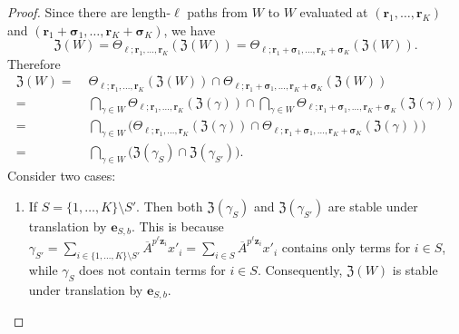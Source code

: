 \documentclass[letterpaper, 11pt, thm-restate]{article}
\numberwithin{equation}{section}
\newcommand{\mZ}{\mathfrak{Z}}
\newcommand{\br}{\boldsymbol{r}}
\newcommand{\bz}{\boldsymbol{z}}
\newcommand{\bsig}{\boldsymbol{\sigma}}
\newcommand{\oA}{\overline{A}}
\theoremstyle{definition}
\theoremstyle{definition}
\theoremstyle{definition}
\begin{document}
\begin{proof}
    Since there are length-$\ell$ paths from $W$ to $W$ evaluated at $(\br_1, \ldots, \br_K)$ and $(\br_1 + \bsig_1, \ldots, \br_K + \bsig_K)$, we have
    \[
    \mZ(W) = \Theta_{\ell; \br_1, \ldots, \br_K}(\mZ(W)) = \Theta_{\ell; \br_1 + \bsig_1, \ldots, \br_K + \bsig_K}(\mZ(W)).
    \]
    Therefore
    \begin{align*}
        \mZ(W)
        = & \; \Theta_{\ell; \br_1, \ldots, \br_K}(\mZ(W)) \cap \Theta_{\ell; \br_1 + \bsig_1, \ldots, \br_K + \bsig_K}(\mZ(W)) \\
        = & \; \bigcap_{\gamma \in W} \Theta_{\ell; \br_1, \ldots, \br_K}(\mZ(\gamma)) \cap \bigcap_{\gamma \in W} \Theta_{\ell; \br_1 + \bsig_1, \ldots, \br_K + \bsig_K}(\mZ(\gamma)) \\
        = & \; \bigcap_{\gamma \in W} \Big(\Theta_{\ell; \br_1, \ldots, \br_K}(\mZ(\gamma)) \cap \Theta_{\ell; \br_1 + \bsig_1, \ldots, \br_K + \bsig_K}(\mZ(\gamma))\Big) \\
        = & \; \bigcap_{\gamma \in W} \big(\mZ(\gamma_S) \cap \mZ(\gamma_{S'}) \big).
    \end{align*}
    Consider two cases:

    \begin{enumerate}[nosep, wide, label=\textbf{Case~\arabic*:}]
        \item 
    If $S = \{1, \ldots, K\} \setminus S'$.
    Then both $\mZ(\gamma_S)$ and $\mZ(\gamma_{S'})$ are stable under translation by $\boldsymbol{e}_{S, b}$.
    This is because $\gamma_{S'} = \sum_{i \in \{1, \ldots, K\} \setminus S'} \oA^{p^{\ell}\bz_{i}} x'_i = \sum_{i \in S} \oA^{p^{\ell}\bz_{i}} x'_i$ contains only terms for $i \in S$, while $\gamma_S$ does not contain terms for $i \in S$.
    Consequently, $\mZ(W)$ is stable under translation by $\boldsymbol{e}_{S, b}$.


\end{enumerate}
\end{proof}
\end{document}

